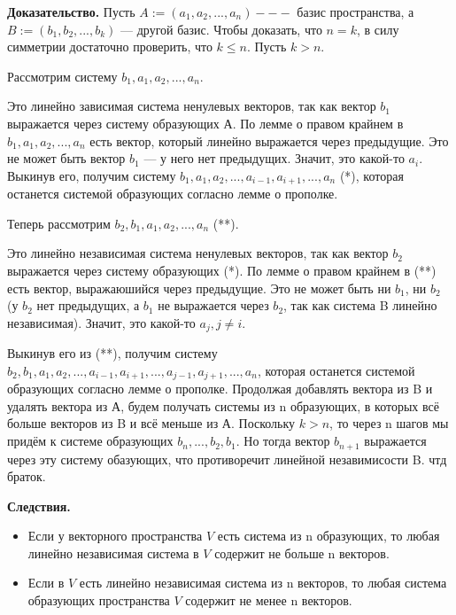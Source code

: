 \documentclass[a4paper]{article}
\begin{document}
    \begin{hproof}
        \textbf{Доказательство.} Пусть $A := (a_1, a_2, ..., a_n) --- $ базис пространства, а $B := (b_1, b_2, ..., b_k)$ --- другой базис. Чтобы доказать, что $n=k$, в силу симметрии достаточно проверить, что $k \leq n$. Пусть $k > n$.

        Рассмотрим систему $b_1, a_1, a_2, ..., a_n$.

        Это линейно зависимая система ненулевых векторов, так как вектор $b_1$ выражается через систему образующих $А$. По лемме о правом крайнем в $b_1, a_1, a_2, ..., a_n$ есть вектор, который линейно выражается через предыдущие. Это не может быть вектор $b_1$ --- у него нет предыдущих. Значит, это какой-то $a_i$. Выкинув его, получим систему $b_1, a_1, a_2, ..., a_{i-1}, a_{i+1}, ..., a_n $ (*), которая останется системой образующих согласно лемме о прополке.

        Теперь рассмотрим $b_2, b_1, a_1, a_2, ..., a_n$ (**).

        Это линейно независимая система ненулевых векторов, так как вектор $b_2$ выражается через систему образующих (*). По лемме о правом крайнем в (**) есть вектор, выражаюшийся через предыдущие. Это не может быть ни $b_1$, ни $b_2$ (у $b_2$ нет предыдущих, а $b_1$ не выражается через $b_2$, так как система B линейно независимая). Значит, это какой-то $a_j, j \neq i$.

        Выкинув его из (**), получим систему $b_2, b_1, a_1, a_2, ..., a_{i-1}, a_{i+1}, ..., a_{j-1}, a_{j+1}, ...,a_n$, которая останется системой образующих согласно лемме о прополке. Продолжая добавлять вектора из B и удалять вектора из А, будем получать системы из n образующих, в которых всё больше векторов из B и всё меньше из А. Поскольку $k>n$, то через n шагов мы придём к системе образующих $b_n, ..., b_2, b_1$. Но тогда вектор $b_{n+1}$ выражается через эту систему обазующих, что противоречит линейной незавимисости B. чтд браток.
    \end{hproof}

    \begin{htheorem}
        \textbf{Следствия.}
        \begin{itemize}
            \item Если у векторного пространства $V$ есть система из n образующих, то любая линейно независимая система в $V$ содержит не больше n векторов.
            \item  Если в $V$ есть линейно независимая система из n векторов, то любая система образующих пространства $V$ содержит не менее n векторов.
        \end{itemize}
    \end{htheorem}
\end{document}
